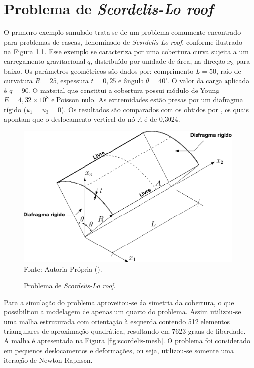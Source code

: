 \chapter[APÊNDICE \ref{Ap:SLR}]{Problema de \textit{Scordelis-Lo roof}}
\label{Ap:SLR}

O primeiro exemplo simulado trata-se de um problema comumente encontrado para problemas de cascas, denominado de \textit{Scordelis-Lo roof}, conforme ilustrado na Figura \ref{fig:scordelis}. Esse exemplo se caracteriza por uma cobertura curva sujeita a um carregamento gravitacional $q$, distribuído por unidade de área, na direção $x_3$ para baixo. Os parâmetros geométricos são dados por: comprimento $L=50$, raio de curvatura $R=25$, espessura $t=0,25$ e ângulo $\theta=40^\circ$. O valor da carga aplicada é $q=90$. O material que constitui a cobertura possui módulo de Young $E=4,32\times10^8$ e Poisson nulo. As extremidades estão presas por um diafragma rígido ($u_1=u_3=0$). Os resultados são comparados com os obtidos por , os quais apontam que o deslocamento vertical do nó $A$ é de 0,3024.

\begin{figure}[h!]
    \centering
    \caption{Problema de \textit{Scordelis-Lo roof}.}
    \includegraphics[width=0.75\linewidth]{Figuras/scordelis/scordelis_lo.pdf}
    \\Fonte: Autoria Própria (\the\year).
    \label{fig:scordelis}
\end{figure}

Para a simulação do problema aproveitou-se da simetria da cobertura, o que possibilitou a modelagem de apenas um quarto do problema. Assim utilizou-se uma malha estruturada com orientação à esquerda contendo 512 elementos triangulares de aproximação quadrática, resultando em 7623 graus de liberdade. A malha é apresentada na Figura \ref{fig:scordelis-mesh}. O problema foi considerado em pequenos deslocamentos e deformações, ou seja, utilizou-se somente uma iteração de Newton-Raphson.

